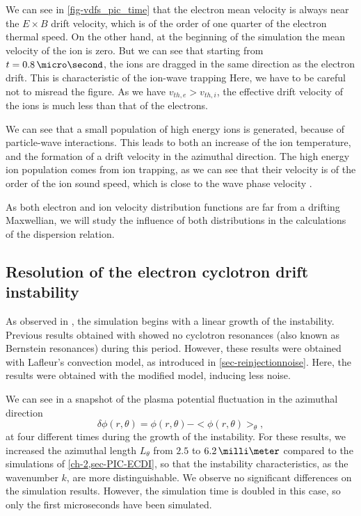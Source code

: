   We can see in \cref{fig-vdfs_pic_time} that the electron mean velocity is always near the $E \times B$ drift velocity, which is of the order of one quarter of the electron thermal speed.
  On the other hand, at the beginning of the simulation the mean velocity of the ion is zero.
  But we can see that starting from $t=0.8\,\micro\second$, the ions are dragged in the same direction as the electron drift.
  This is characteristic of the ion-wave trapping \citep{lafleur2017a}
  Here, we have to be careful not to misread the figure.
  As we have $v_{th, e} > v_{th, i}$, the effective drift velocity of the ions is much less than that of the electrons.
  
  We can see that a small population of high energy ions is generated, because of particle-wave interactions.
  This leads to both an increase of the ion temperature, and the formation of a drift velocity in the azimuthal direction.
  The high energy ion population comes from ion trapping, as we can see that their velocity is of the order of the ion sound speed, which is close to the wave phase velocity \citep{lafleur2018}.
  
  As both electron and ion velocity distribution functions are far from a drifting Maxwellian, we will study the influence of both distributions in the calculations of the dispersion relation.
  
  
  \subsection{Resolution of the electron cyclotron drift instability} \label{subsec-ECDIPIC}
  
  
    As observed in , the simulation begins with a linear growth of the instability.
    Previous results obtained with \LPPic \citep{croes2017a} showed no cyclotron resonances (also known as Bernstein resonances) during this period.
    However, these results were obtained with Lafleur's convection model, as introduced in \cref{sec-reinjectionnoise}.
    Here, the results were obtained with the modified model, inducing less noise.
    
    
    We can see in   a snapshot of the plasma potential fluctuation in the azimuthal direction \[ \delta \phi(r, \theta) = \phi(r, \theta) - < \phi(r, \theta) >_{ \theta}, \]
    at four different times during the growth of the instability.
    For these results, we increased the azimuthal length $L_{\theta}$ from $2.5$ to $6.2\,\milli\meter$ compared to the simulations of \cref{ch-2,sec-PIC-ECDI}, so that the instability characteristics, as the wavenumber $k$, are more distinguishable.
    We observe no significant differences on the simulation results.
    However, the simulation time is doubled in this case, so only the first microseconds have been simulated.
    

